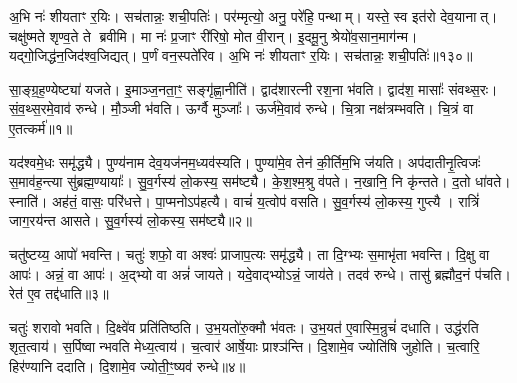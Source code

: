अ॒भि नः॑ शीयताꣳ र॒यिः।
सच॑तान्नः॒ शची॒पतिः॑।
पर॑म्मृत्यो॒ अनु॒ परे॑हि॒ पन्थाम्।
यस्ते॒ स्व इत॑रो देव॒यानात्।
चक्षु॑ष्मते शृण्व॒ते ते ब्रवीमि।
मा नः॑ प्र॒जाꣳ री॑रिषो॒ मोत वी॒रान्।
इ॒दमू॒नु श्रेयो॑व॒सान॒माग॑न्म।
यद्गो॒जिद्ध॑न॒जिद॑श्व॒जिद्यत्।
प॒र्णं वन॒स्पते॑रिव।
अ॒भि नः॑ शीयताꣳ र॒यिः।
सच॑तान्नः॒ शची॒पतिः॑॥१३०॥\anuvakamend[वन॒स्पता॑व॒द्भ्यो लो॒का द॑धिरे॒ तेज॑ इन्द्रि॒यन्धामा॑शीमहीवा॒भिनः॑ शीयताꣳ र॒यिरेकं॑ च]




\clearpage
{}
\setcounter{anuvakam}{0}

सा॒ङ्ग्र॒ह॒ण्येष्ट्या॑ यजते।
इ॒माञ्ज॒नता॒ꣳ॒ सङ्गृ॑ह्णा॒नीति॑।
द्वाद॑शारत्नी रश॒ना भ॑वति।
द्वाद॑श॒ मासाः᳚ संवथ्स॒रः।
सं॒व॒थ्स॒रमे॒वाव॑ रुन्धे।
मौ॒ञ्जी भ॑वति।
ऊर्ग्वै मुञ्जाः᳚।
ऊर्ज॑मे॒वाव॑ रुन्धे।
चि॒त्रा नक्ष॑त्रम्भवति।
चि॒त्रं वा ए॒तत्कर्म॑॥१॥

यद॑श्वमे॒धः समृ॑द्ध्यै।
पुण्य॑नाम देव॒यज॑नम॒ध्यव॑स्यति।
पुण्या॑मे॒व तेन॑ की॒र्तिम॒भि ज॑यति।
अप॑दातीनृ॒त्विजः॑ स॒माव॑ह॒न्त्या सु॑ब्रह्म॒ण्यायाः᳚।
सु॒व॒र्गस्य॑ लो॒कस्य॒ सम॑ष्ट्यै।
के॒श॒श्म॒श्रु व॑पते।
न॒खानि॒ नि कृ॑न्तते।
द॒तो धा॑वते।
स्नाति॑।
अह॑तं॒ वासः॒ परि॑धत्ते।
पा॒प्मनो\-ऽप॑हत्यै।
वाचं॑ य॒त्वोप॑ वसति।
सु॒व॒र्गस्य॑ लो॒कस्य॒ गुप्त्यै।
रात्रिं॑ जाग॒रय॑न्त आसते।
सु॒व॒र्गस्य॑ लो॒कस्य॒ सम॑ष्ट्यै॥२॥\anuvakamend[कर्म॑ धत्ते॒ पञ्च॑ च]

चतु॑ष्टय्य॒ आपो॑ भवन्ति।
चतुः॑ शफो॒ वा अश्वः॑ प्राजाप॒त्यः समृ॑द्ध्यै।
ता दि॒ग्भ्यः स॒माभृ॑ता भवन्ति।
दि॒क्षु वा आपः॑।
अन्नं॒ वा आपः॑।
अ॒द्भ्यो वा अन्नं॑ जायते।
यदे॒वाद्भ्यो\-ऽन्नं॒ जाय॑ते।
तदव॑ रुन्धे।
तासु॑ ब्रह्मौद॒नं प॑चति।
रेत॑ ए॒व तद्द॑धाति॥३॥

चतुः॑ शरावो भवति।
दि॒क्ष्वे॑व प्रति॑तिष्ठति।
उ॒भ॒यतो॑रु॒क्मौ भ॑वतः।
उ॒भ॒यत॑ ए॒वास्मि॒न्रुचं॑ दधाति।
उद्ध॑रति शृत॒त्वाय॑।
स॒र्पिष्वान्भवति मेध्य॒त्वाय॑।
च॒त्वार॑ आर्\mbox{}षे॒याः प्राश्ञ॑न्ति।
दि॒शामे॒व ज्योति॑षि जुहोति।
च॒त्वारि॒ हिर॑ण्यानि ददाति।
दि॒शामे॒व ज्योती॒ꣳ॒ष्यव॑ रुन्धे॥४॥

